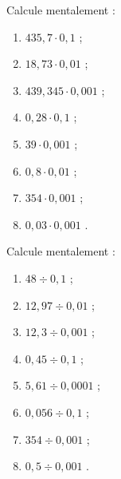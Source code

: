 \begin{exercice}
Calcule mentalement :
\begin{enumerate} 
 \item $435,7 \cdot 0,1$ \dotfill ; \hspace*{11em}
 
 \item $18,73 \cdot 0,01$ \dotfill ; \hspace*{11em}
 
 \item $439,345 \cdot 0,001$ \dotfill ; \hspace*{11em}
 
 \item $0,28 \cdot 0,1$ \dotfill ; \hspace*{11em}
 
 \item $39 \cdot 0,001$ \dotfill ; \hspace*{11em}
 
 \item $0,8 \cdot 0,01$ \dotfill ; \hspace*{11em}
 
 \item $354 \cdot 0,001$ \dotfill ; \hspace*{11em}
 
 \item $0,03 \cdot 0,001$ \dotfill. \hspace*{11em}
 
 \end{enumerate}
\end{exercice}

\begin{exercice}
Calcule mentalement :
\begin{enumerate} 
 \item $48 \div 0,1$ \dotfill ; \hspace*{11em}
 
 \item $12,97 \div 0,01$ \dotfill ; \hspace*{11em}

 \item $12,3 \div 0,001$ \dotfill ; \hspace*{11em}
 
 \item $0,45 \div 0,1$ \dotfill ; \hspace*{11em}
 	
 \item $5,61 \div 0,0001$ \dotfill ; \hspace*{11em}
 	
 \item $0,056 \div 0,1$ \dotfill ; \hspace*{11em}
 
 \item $354 \div 0,001$ \dotfill ; \hspace*{11em}
 
 \item $0,5 \div 0,001$ \dotfill. \hspace*{11em}

 \end{enumerate}
\end{exercice}


